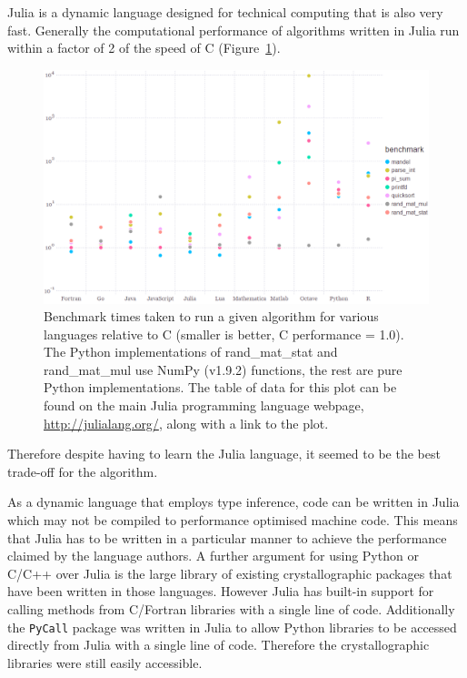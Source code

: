 Julia is a dynamic language designed for technical computing \cite{bezanson2014julia,bezanson2012julia} that is also very fast.
Generally the computational performance of algorithms written in Julia run within a factor of 2 of the speed of C (Figure~\ref{fig:Language performance benchmarks}).
\begin{figure}[ht!]
    \centering
    \includegraphics[width=1.0\textwidth]{figures/datared/language_benchmarks.png}
    \caption{Benchmark times taken to run a given algorithm for various languages relative to C (smaller is better, C performance = 1.0).
    The Python implementations of rand\_mat\_stat and rand\_mat\_mul use NumPy (v1.9.2) functions, the rest are pure Python implementations.
    The table of data for this plot can be found on the main Julia programming language webpage, \url{http://julialang.org/}, along with a link to the plot.}
    \label{fig:Language performance benchmarks}
\end{figure}
Therefore despite having to learn the Julia language, it seemed to be the best trade-off for the algorithm.

As a dynamic language that employs type inference, code can be written in Julia which may not be compiled to performance optimised machine code.
This means that Julia has to be written in a particular manner to achieve the performance claimed by the language authors.
A further argument for using Python or C/C++ over Julia is the large library of existing crystallographic packages that have been written in those languages.
However Julia has built-in support for calling methods from C/Fortran libraries with a single line of code.
Additionally the \verb+PyCall+ package was written in Julia to allow Python libraries to be accessed directly from Julia with a single line of code.
Therefore the crystallographic libraries were still easily accessible.
